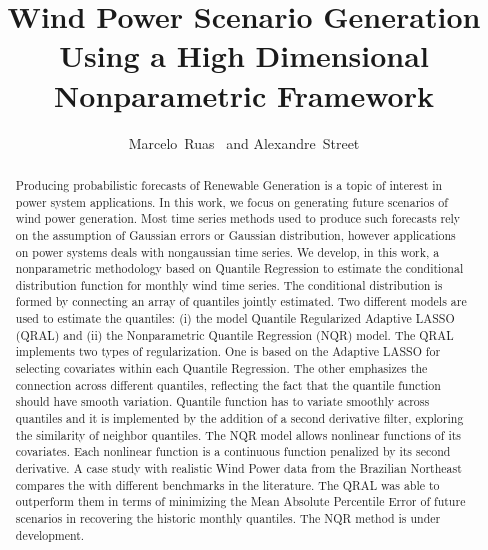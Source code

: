 \documentclass[letter, onecolumn, 12pt]{IEEEtran} %
\begin{document}
\title{Wind Power Scenario Generation Using a High Dimensional Nonparametric Framework}

\author{Marcelo~Ruas~%
	and Alexandre~Street%
	
	
}

\maketitle


\begin{abstract}
	Producing probabilistic forecasts of Renewable Generation is a topic of interest in power system applications. In this work, we focus on generating future scenarios of wind power generation.  Most time series methods used to produce such forecasts rely on the assumption of Gaussian errors or Gaussian distribution, however applications on power systems deals with nongaussian time series.  
	We develop, in this work, a nonparametric methodology based on Quantile Regression to estimate the conditional distribution function for monthly wind time series.  
	The conditional distribution is formed by connecting an array of quantiles jointly estimated. 
	Two different models are used to estimate the quantiles: (i) the model Quantile Regularized Adaptive LASSO (QRAL) and (ii) the Nonparametric Quantile Regression (NQR) model.
	The QRAL implements two types of regularization. One is based on the Adaptive LASSO for selecting covariates within each Quantile Regression. The other emphasizes the connection across different quantiles, reflecting the fact that the quantile function should have smooth variation. Quantile function has to variate smoothly across quantiles and it is implemented by the addition of a second derivative filter, 
exploring the similarity of neighbor quantiles. The NQR model allows nonlinear functions of its covariates. Each nonlinear function is a continuous function penalized by its second derivative.
	A case study with realistic Wind Power data from the Brazilian Northeast compares the  with different benchmarks in the literature. The QRAL was able to outperform them in terms of minimizing the Mean Absolute Percentile Error of future scenarios in recovering the historic monthly quantiles. The NQR method is under development.
\end{abstract}
\end{document}
